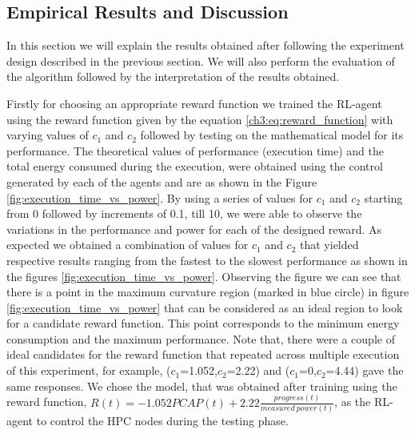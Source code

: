 \subsection{Empirical Results and Discussion} 
\label{Sec:Results}
In this section we will explain the results obtained after following the experiment design described in the previous section. We will also perform the evaluation of the algorithm followed by the interpretation of the results obtained.
  
Firstly for choosing an appropriate reward function we trained the RL-agent using the reward function given by the equation \eqref{ch3:eq:reward_function} with varying values of $c_1$ and $c_2$ followed by testing on the mathematical model for its performance.
 The theoretical values of performance (execution time) and the total energy consumed during the execution, were obtained using the control generated by each of the agents and are as shown in the Figure \ref{fig:execution_time_vs_power}.
 By using a series of values for $c_1$ and $c_2$ starting from 0 followed by increments of 0.1, till 10, we were able to observe the variations in the performance and power for each of the designed reward. As expected we obtained a combination of values for $c_1$ and $c_2$ that yielded respective results ranging from the fastest to the slowest performance as shown in the figures \ref{fig:execution_time_vs_power}.
Observing the figure we can see that there is a point in the maximum curvature region (marked in blue circle) in figure \ref{fig:execution_time_vs_power} that can be considered as an ideal region to look for a candidate reward function. This point corresponds to the minimum energy consumption and the maximum performance. Note that, there were a couple of ideal candidates for the reward function that repeated across multiple execution of this experiment, for example, ($c_1$=1.052,$c_2$=2.22) and ($c_1$=0,$c_2$=4.44) gave the same responses. We chose the model, that was obtained after training using the reward function, $R(t) = -1.052 PCAP(t) + 2.22 \frac{progress(t)}{measured \ power(t)}$, as the RL-agent to control the HPC nodes during the testing phase.
